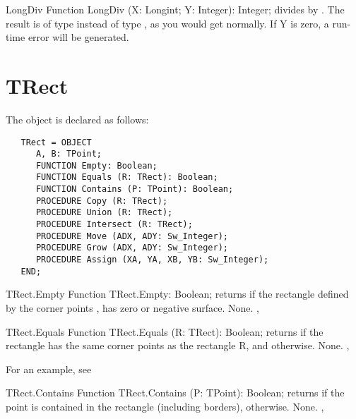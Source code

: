 \begin{function}{LongDiv}
\Declaration
Function LongDiv (X: Longint; Y: Integer): Integer;
\Description
{} divides  by . The result is of
type  instead of type , as you would get 
normally. 
\Errors
If Y is zero, a run-time error will be generated.
\SeeAlso
{}
\end{function}

\section{TRect}
\label{se:TRect}

The  object is declared as follows:
\begin{verbatim}
   TRect = OBJECT
      A, B: TPoint;
      FUNCTION Empty: Boolean;
      FUNCTION Equals (R: TRect): Boolean;
      FUNCTION Contains (P: TPoint): Boolean;
      PROCEDURE Copy (R: TRect);
      PROCEDURE Union (R: TRect);
      PROCEDURE Intersect (R: TRect);
      PROCEDURE Move (ADX, ADY: Sw_Integer);
      PROCEDURE Grow (ADX, ADY: Sw_Integer);
      PROCEDURE Assign (XA, YA, XB, YB: Sw_Integer);
   END;
\end{verbatim}

\begin{function}{TRect.Empty}
\Declaration
Function TRect.Empty: Boolean;
\Description
{} returns  if the rectangle defined by the corner points 
,  has zero or negative surface.
\Errors
None.
\SeeAlso
{}, 
\end{function}

\html{}

\begin{function}{TRect.Equals}      
\Declaration
Function TRect.Equals (R: TRect): Boolean;
\Description
{} returns  if the rectangle has the 
same corner points  as the rectangle R, and 
otherwise.
\Errors
None.
\SeeAlso
{}, 
\end{function}

For an example, see 

\begin{function}{TRect.Contains}
\Declaration
Function TRect.Contains (P: TPoint): Boolean;
\Description
{} returns  if the point  is contained
in the rectangle (including borders),  otherwise.
\Errors
None.
\SeeAlso
{}, 
\end{function}

